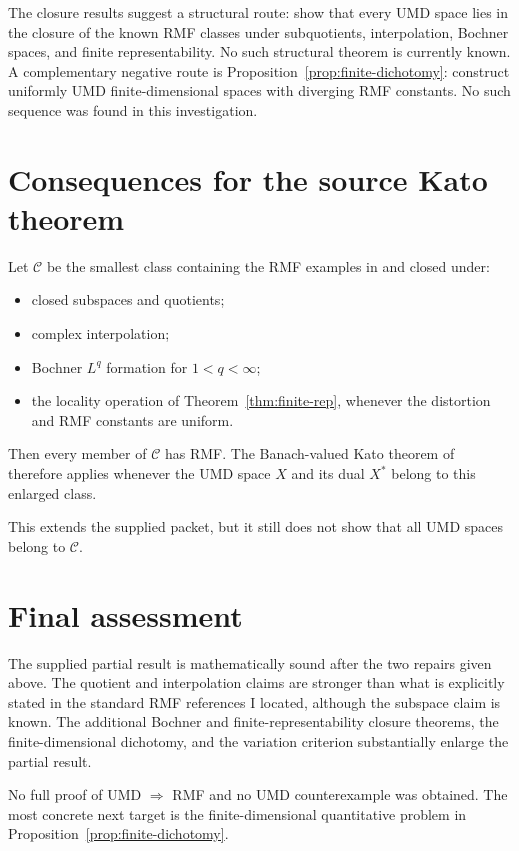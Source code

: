 \documentclass[11pt]{article}
\theoremstyle{definition}
\newcommand{\1}{\mathbf 1}
\begin{document}
The closure results suggest a structural route: show that every UMD space lies
in the closure of the known RMF classes under subquotients, interpolation,
Bochner spaces, and finite representability.  No such structural theorem is
currently known.  A complementary negative route is
Proposition~\ref{prop:finite-dichotomy}: construct uniformly UMD
finite-dimensional spaces with diverging RMF constants.  No such sequence
was found in this investigation.

\section{Consequences for the source Kato theorem}

Let $\mathcal C$ be the smallest class containing the RMF examples in
\cite{HMP} and closed under:
\begin{itemize}[nosep]
\item closed subspaces and quotients;
\item complex interpolation;
\item Bochner $L^q$ formation for $1<q<\infty$;
\item the locality operation of Theorem~\ref{thm:finite-rep}, whenever the
distortion and RMF constants are uniform.
\end{itemize}
Then every member of $\mathcal C$ has RMF.  The Banach-valued Kato theorem of
\cite{HMP} therefore applies whenever the UMD space $X$ and its dual $X^*$
belong to this enlarged class.

This extends the supplied packet, but it still does not show that all UMD spaces
belong to $\mathcal C$.

\section{Final assessment}

The supplied partial result is mathematically sound after the two repairs given
above.  The quotient and interpolation claims are stronger than what is
explicitly stated in the standard RMF references I located, although the
subspace claim is known.  The additional Bochner and finite-representability
closure theorems, the finite-dimensional dichotomy, and the variation criterion
substantially enlarge the partial result.

No full proof of UMD $\Rightarrow$ RMF and no UMD counterexample was obtained.
The most concrete next target is the finite-dimensional quantitative problem in
Proposition~\ref{prop:finite-dichotomy}.
\end{document}

